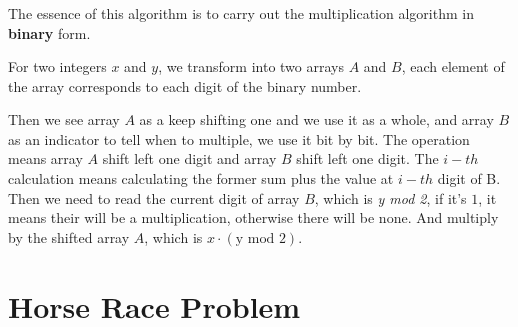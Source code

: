 \documentclass{article}
\begin{document}
\subsubsection{}
The essence of this algorithm is to carry out the multiplication algorithm in \textbf{binary} form.
\par For two integers $x$ and $y$, we transform into two arrays $A$ and $B$, each element of the array corresponds to each digit of the binary number.
\par Then we see array $A$ as a keep shifting one and we use it as a whole, and array $B$ as an indicator to tell when to multiple, we use it bit by bit. The  operation means array $A$ shift left one digit and array $B$ shift left one digit. The $i-th$ calculation means calculating the former sum plus the value at $i-th$ digit of B. Then we need to read the current digit of array $B$, which is \textit{y mod 2}, if it's $1$, it means their will be a multiplication, otherwise there will be none. And multiply by the shifted array $A$, which is $x \cdot (\text{y mod 2})$.

\section{Horse Race Problem}
\end{document}
